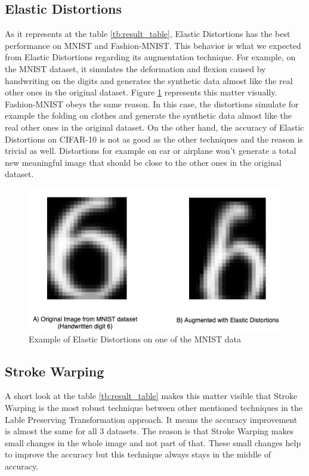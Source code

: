 \subsection{Elastic Distortions}
As it represents at the table \ref{tb:result_table}, Elastic Distortions has the best performance on MNIST and Fashion-MNIST. This behavior is what we expected from Elastic Distortions regarding its augmentation technique. For example, on the MNIST dataset, it simulates the deformation and flexion caused by handwriting on the digits and generates the synthetic data almost like the real other ones in the original dataset. Figure \ref{fig:Elastic_Distortion_Example} represents this matter visually. Fashion-MNIST obeys the same reason. In this case, the distortions simulate for example the folding on clothes and generate the synthetic data almost like the real other ones in the original dataset. On the other hand, the accuracy of Elastic Distortions on CIFAR-10 is not as good as the other techniques and the reason is trivial as well. Distortions for example on car or airplane won't generate a total new meaningful image that should be close to the other ones in the original dataset.

\begin{figure}
  \centering
  \label{fig:Elastic_Distortion_Example}
  \includegraphics[width=1\textwidth]{fig/result/Elastic-Distortions-Example}
  \caption{Example of Elastic Distortions on one of the MNIST data}
\end{figure}

\subsection{Stroke Warping}
A short look at the table \ref{tb:result_table} makes this matter visible that Stroke Warping is the most robust technique between other mentioned techniques in the Lable Preserving Transformation approach. It means the accuracy improvement is almost the same for all $3$ datasets. The reason is that Stroke Warping makes small changes in the whole image and not part of that. These small changes help to improve the accuracy but this technique always stays in the middle of accuracy.


